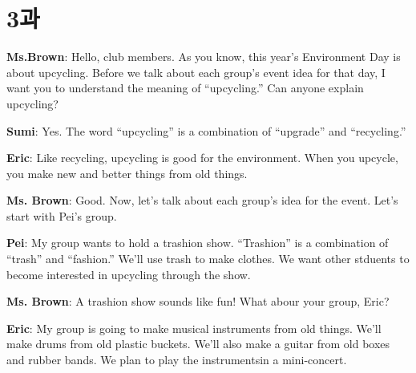 \documentclass[9pt, a4paper]{oblivoir}
\begin{document}
            
            
            
            
        

        \newpage


        \section*{3과}

        \textbf{Ms.Brown}: Hello, club members. As you know, this year's Environment Day is about upcycling.
        Before we talk about each group's event idea for that day, I want you to understand the meaning of ``upcycling.''
        Can anyone explain upcycling? \newline

        \noindent
        \textbf{Sumi}: Yes. The word ``upcycling'' is a combination of ``upgrade'' and ``recycling.''\newline

        \noindent
        \textbf{Eric}: Like recycling, upcycling is good for the environment. When you upcycle, you make new and better things from old things.\newline

        \noindent
        \textbf{Ms. Brown}: Good. Now, let's talk about each group's idea for the event. Let's start with Pei's group.\newline

        \noindent
        \textbf{Pei}: My group wants to hold a trashion show. ``Trashion'' is a combination of ``trash'' and ``fashion.'' 
        We'll use trash to make clothes. We want other stduents to become interested in upcycling through the show. \newline

        \noindent
        \textbf{Ms. Brown}: A trashion show sounds like fun! What abour your group, Eric?\newline

        \noindent
        \textbf{Eric}: My group is going to make musical instruments from old things. We'll make drums from old plastic buckets. 
        We'll also make a guitar from old boxes and rubber bands. We plan to play the instrumentsin a mini-concert. \newline
\end{document}
